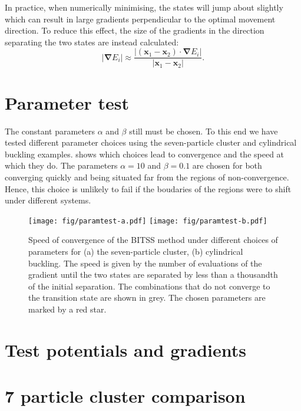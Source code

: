\documentclass[aps,prl]{revtex4}
\newcommand{\abs}[1]{\left| #1 \right|}
\newcommand{\grad}[1]{\bm{\nabla} #1}
\begin{document}
In practice, when numerically minimising, the states will jump about slightly which can result in large gradients perpendicular to the optimal movement direction.
To reduce this effect, the size of the gradients in the direction separating the two states are instead calculated:
\begin{equation}
  \abs{\grad{E_i}} \approx \frac {\abs{(\bm{x}_1 - \bm{x}_2) \cdot \grad{E_i}}} {\abs{\bm{x}_1 - \bm{x}_2}}.
\end{equation}


\section{Parameter test}
The constant parameters $\alpha$ and $\beta$ still must be chosen.
To this end we have tested different parameter choices using the seven-particle cluster and cylindrical buckling examples.
 shows which choices lead to convergence and the speed at which they do.
The parameters $\alpha = 10$ and $\beta = 0.1$ are chosen for both converging quickly and being situated far from the regions of non-convergence.
Hence, this choice is unlikely to fail if the boudaries of the regions were to shift under different systems.

\begin{figure} \label{fig:paramtest}
  \texttt{[image: fig/paramtest-a.pdf]}%
  \texttt{[image: fig/paramtest-b.pdf]}%
  \caption{
    Speed of convergence of the BITSS method under different choices of parameters for (a) the seven-particle cluster, (b) cylindrical buckling.
    The speed is given by the number of evaluations of the gradient until the two states are separated by less than a thousandth of the initial separation.
    The combinations that do not converge to the transition state are shown in grey. 
    The chosen parameters are marked by a red star.
  }
\end{figure}


\section{Test potentials and gradients}


\section{7 particle cluster comparison}
\end{document}
